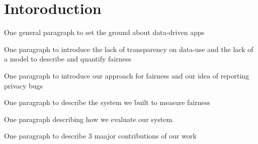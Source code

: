 
\section{Intoroduction}
One general paragraph to set the ground about data-driven apps

One paragraph to introduce the lack of transparency on data-use
and the lack of a model to describe and quantify fairness

One paragraph to introduce our approach for fairness and our
idea of reporting privacy bugs

One paragraph to describe the system we built to measure fairness

One paragraph describing how we evaluate our system.

One paragraph to describe 3 maajor contributions of our work

